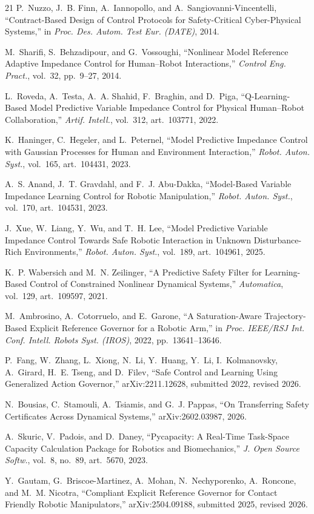\documentclass[journal]{IEEEtran}
\begin{document}
\begin{thebibliography}{21}
 P.~Nuzzo, J.~B. Finn, A.~Iannopollo, and A.~Sangiovanni-Vincentelli, ``Contract-Based Design of Control Protocols for Safety-Critical Cyber-Physical Systems,'' in \emph{Proc. Des. Autom. Test Eur. (DATE)}, 2014.

 M.~Sharifi, S.~Behzadipour, and G.~Vossoughi, ``Nonlinear Model Reference Adaptive Impedance Control for Human--Robot Interactions,'' \emph{Control Eng. Pract.}, vol.~32, pp.~9--27, 2014.

 L.~Roveda, A.~Testa, A.~A. Shahid, F.~Braghin, and D.~Piga, ``Q-Learning-Based Model Predictive Variable Impedance Control for Physical Human--Robot Collaboration,'' \emph{Artif. Intell.}, vol.~312, art.~103771, 2022.

 K.~Haninger, C.~Hegeler, and L.~Peternel, ``Model Predictive Impedance Control with Gaussian Processes for Human and Environment Interaction,'' \emph{Robot. Auton. Syst.}, vol.~165, art.~104431, 2023.

 A.~S. Anand, J.~T. Gravdahl, and F.~J. Abu-Dakka, ``Model-Based Variable Impedance Learning Control for Robotic Manipulation,'' \emph{Robot. Auton. Syst.}, vol.~170, art.~104531, 2023.

 J.~Xue, W.~Liang, Y.~Wu, and T.~H. Lee, ``Model Predictive Variable Impedance Control Towards Safe Robotic Interaction in Unknown Disturbance-Rich Environments,'' \emph{Robot. Auton. Syst.}, vol.~189, art.~104961, 2025.

 K.~P. Wabersich and M.~N. Zeilinger, ``A Predictive Safety Filter for Learning-Based Control of Constrained Nonlinear Dynamical Systems,'' \emph{Automatica}, vol.~129, art.~109597, 2021.

 M.~Ambrosino, A.~Cotorruelo, and E.~Garone, ``A Saturation-Aware Trajectory-Based Explicit Reference Governor for a Robotic Arm,'' in \emph{Proc. IEEE/RSJ Int. Conf. Intell. Robots Syst. (IROS)}, 2022, pp.~13641--13646.

 P.~Fang, W.~Zhang, L.~Xiong, N.~Li, Y.~Huang, Y.~Li, I.~Kolmanovsky, A.~Girard, H.~E. Tseng, and D.~Filev, ``Safe Control and Learning Using Generalized Action Governor,'' arXiv:2211.12628, submitted 2022, revised 2026.

 N.~Bousias, C.~Stamouli, A.~Tsiamis, and G.~J. Pappas, ``On Transferring Safety Certificates Across Dynamical Systems,'' arXiv:2602.03987, 2026.

 A.~Skuric, V.~Padois, and D.~Daney, ``Pycapacity: A Real-Time Task-Space Capacity Calculation Package for Robotics and Biomechanics,'' \emph{J. Open Source Softw.}, vol.~8, no.~89, art.~5670, 2023.

 Y.~Gautam, G.~Briscoe-Martinez, A.~Mohan, N.~Nechyporenko, A.~Roncone, and M.~M. Nicotra, ``Compliant Explicit Reference Governor for Contact Friendly Robotic Manipulators,'' arXiv:2504.09188, submitted 2025, revised 2026.

\end{thebibliography}
\end{document}
